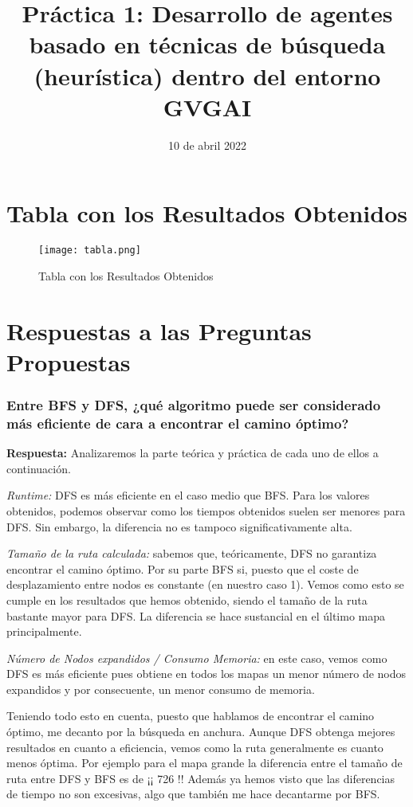 \documentclass[10pt, a4paper]{article}
\title{\vspace{3cm}\textcolor{ugrColor}{\textbf{{{{\Huge Práctica 1: Desarrollo de agentes basado en técnicas de búsqueda
(heurística) dentro del entorno GVGAI}}}}}}
\date{10 de abril 2022}
\theoremstyle{theorem-style}
\theoremstyle{theorem-style}
\theoremstyle{theorem2-style}
\theoremstyle{definition-style}
\theoremstyle{remark-style}
\theoremstyle{example-style}
\theoremstyle{definition-style}
\theoremstyle{remark-style}
\theoremstyle{remark-style}
\begin{document}
\section{Tabla con los Resultados Obtenidos}

\begin{figure}[htp]
\centering
\texttt{[image: tabla.png]}
\caption{Tabla con los Resultados Obtenidos}
\label{}
\end{figure}

\section{Respuestas a las Preguntas Propuestas}

\subsubsection*{Entre BFS y DFS, ¿qué algoritmo puede ser considerado más eficiente de cara a
encontrar el camino óptimo?}

\textbf{Respuesta:} Analizaremos la parte teórica y práctica de cada uno de ellos a continuación. 

\textit{Runtime:} DFS es más eficiente en el caso medio que BFS. Para los valores obtenidos, podemos observar como los tiempos obtenidos suelen ser menores para DFS. Sin embargo, la diferencia no es tampoco significativamente alta. 

\textit{Tamaño de la ruta calculada:} sabemos que, teóricamente, DFS no garantiza encontrar el camino óptimo. Por su parte BFS si, puesto que el coste de desplazamiento entre nodos es constante (en nuestro caso 1). Vemos como esto se cumple en los resultados que hemos obtenido, siendo el tamaño de la ruta bastante mayor para DFS. La diferencia se hace sustancial en el último mapa principalmente. 

\textit{Número de Nodos expandidos / Consumo Memoria:} en este caso, vemos como DFS es más eficiente pues obtiene en todos los mapas un menor número de nodos expandidos y por consecuente, un menor consumo de memoria. 

Teniendo todo esto en cuenta, puesto que hablamos de encontrar el camino óptimo, me decanto por la búsqueda en anchura. Aunque DFS obtenga mejores resultados en cuanto a eficiencia, vemos como la ruta generalmente es cuanto menos óptima. Por ejemplo para el mapa grande la diferencia entre el tamaño de ruta entre DFS y BFS es de ¡¡ 726 !! Además ya hemos visto que las diferencias de tiempo no son excesivas, algo que también me hace decantarme por BFS.
\end{document}
